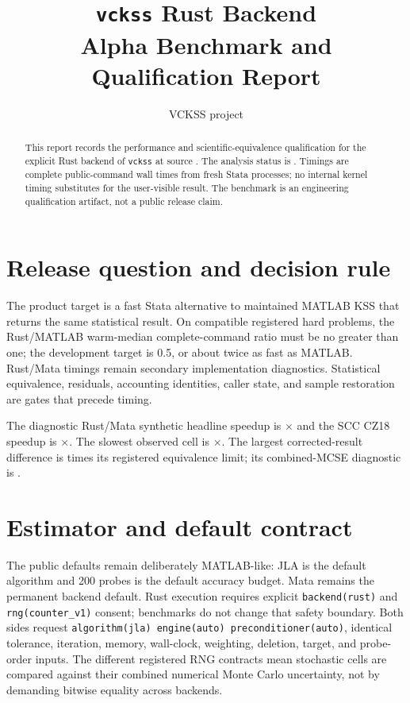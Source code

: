 \documentclass[11pt]{article}
\title{\texttt{vckss} Rust Backend\\Alpha Benchmark and Qualification Report}
\author{VCKSS project}
\date{\AlphaGenerated}
\begin{document}
\maketitle

\begin{abstract}
This report records the performance and scientific-equivalence qualification
for the explicit Rust backend of \texttt{vckss} at source
\AlphaSourceShort.  The analysis status is \textbf{\AlphaStatus}.  Timings are
complete public-command wall times from fresh Stata processes; no internal
kernel timing substitutes for the user-visible result.  The benchmark is an
engineering qualification artifact, not a public release claim.
\end{abstract}

\section{Release question and decision rule}

The product target is a fast Stata alternative to maintained MATLAB KSS that
returns the same statistical result.  On compatible registered hard problems,
the Rust/MATLAB warm-median complete-command ratio must be no greater than one;
the development target is 0.5, or about twice as fast as MATLAB.  Rust/Mata
timings remain secondary implementation diagnostics.  Statistical
equivalence, residuals, accounting identities, caller state, and sample
restoration are gates that precede timing.

The diagnostic Rust/Mata synthetic headline speedup is
\textbf{\AlphaSyntheticSpeedup}$\times$ and the SCC CZ18 speedup is
\textbf{\AlphaCzSpeedup}$\times$.  The slowest observed cell is
\AlphaMinimumSpeedup$\times$.  The largest corrected-result difference is
\AlphaMaxEquivalenceRatio times its registered equivalence limit; its
combined-MCSE diagnostic is \AlphaMaxParityZ.

\section{Estimator and default contract}

The public defaults remain deliberately MATLAB-like: JLA is the default
algorithm and 200 probes is the default accuracy budget.  Mata remains the
permanent backend default.  Rust execution requires explicit
\texttt{backend(rust)} and \texttt{rng(counter\_v1)} consent; benchmarks do not
change that safety boundary.  Both sides request
\texttt{algorithm(jla) engine(auto) preconditioner(auto)}, identical
tolerance, iteration, memory, wall-clock, weighting, deletion, target, and
probe-order inputs.  The different registered RNG contracts mean stochastic
cells are compared against their combined numerical Monte Carlo uncertainty,
not by demanding bitwise equality across backends.
\end{document}
